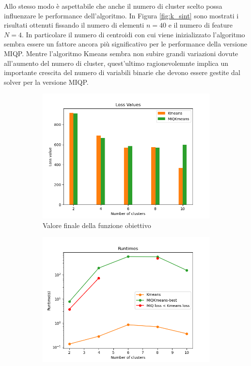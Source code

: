 \documentclass{article}
\begin{document}
    Allo stesso modo è aspettabile che anche il numero di cluster scelto possa influenzare le performance dell'algoritmo. In Figura \ref{fig:k_sint} sono mostrati i risultati ottenuti fissando il numero di elementi $n=40$ e il numero di feature $N=4$. In particolare il numero di centroidi con cui viene inizializzato l'algoritmo sembra essere un fattore ancora più significativo per le performance della versione MIQP.
    Mentre l'algoritmo Kmeans sembra non subire grandi variazioni dovute all'aumento del numero di cluster, quest'ultimo ragionevolemnte implica un importante crescita del numero di variabili binarie che devono essere gestite dal solver per la versione MIQP.\\
    \begin{figure}[H]
     \centering
     \begin{subfigure}[t]{0.49\linewidth}
         \centering
         \includegraphics[width=\linewidth]{../results/log_plots/loss_centers_sint}
         \caption{Valore finale della funzione obiettivo}
     \end{subfigure}
     \hfill
     \begin{subfigure}[t]{0.49\linewidth}
         \centering
         \includegraphics[width=\linewidth]{../results/log_plots/runtime_centers_sint_log}

\end{subfigure}
\end{figure}
\end{document}

